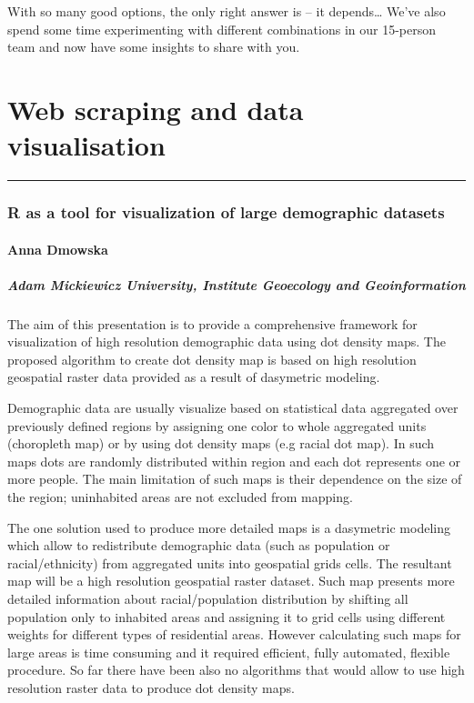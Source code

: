 \documentclass [12pt]{article}
\begin{document}
With so many good options, the only right answer is – it depends… We’ve also spend some time experimenting with different combinations in our 15-person team and now have some insights to share with you.
\newpage
{}
\part{Web scraping and data visualisation}

\noindent\rule{\textwidth}{1pt}
\section{R as a tool for visualization of large demographic datasets}
\subsection*{Anna	Dmowska}
\subsubsection*{Adam Mickiewicz University, Institute Geoecology and Geoinformation}

The aim of this presentation is to provide a comprehensive framework for visualization of high resolution demographic data using dot density maps. The proposed algorithm to create dot density map is based on high resolution geospatial raster data provided as a result of dasymetric modeling.

Demographic data are usually visualize based on statistical data aggregated over previously defined regions by assigning one color to whole aggregated units (choropleth map) or by using dot density maps (e.g racial dot map). In such maps dots are randomly distributed within region and each dot represents one or more people. The main limitation of such maps is their dependence on the size of the region; uninhabited areas are not excluded from mapping.

The one solution used to produce more detailed maps is a dasymetric modeling which allow to redistribute demographic data (such as population or racial/ethnicity) from aggregated units into geospatial grids cells. The resultant map will be a high resolution geospatial raster dataset. Such map presents more detailed information about racial/population distribution by shifting all population only to inhabited areas and assigning it to grid cells using different weights for different types of residential areas. However calculating such maps for large areas is time consuming and it required efficient, fully automated, flexible procedure. So far there have been also no algorithms that would allow to use high resolution raster data to produce dot density maps.
\end{document}
